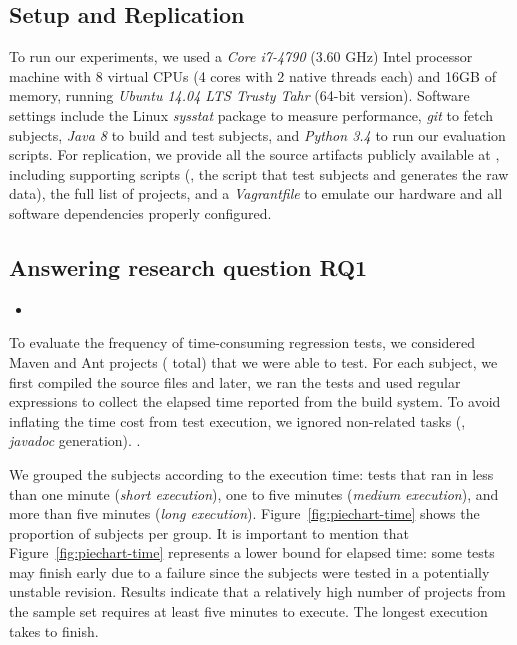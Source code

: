 \subsection{Setup and Replication}
\label{sec:setup}

To run our experiments, we used a \emph{Core i7-4790} (3.60 GHz) Intel
processor machine with 8 virtual CPUs (4 cores with 2 native threads
each) and 16GB of memory, running \emph{Ubuntu 14.04 LTS Trusty Tahr}
(64-bit version). Software settings include the Linux \emph{sysstat}
package to measure performance, \emph{git} to fetch subjects,
\emph{Java 8} to build and test subjects, and \emph{Python 3.4} to run
our evaluation scripts. For replication, we provide all the source
artifacts publicly available at , including
supporting scripts (\eg, the script that test subjects and generates
the raw data), the full list of projects, and a \emph{Vagrantfile} to
emulate our hardware and all software dependencies properly configured.

\subsection{Answering research question RQ1}
\label{sec:rqone}

\begin{itemize}
    \item \RQA
\end{itemize}

To evaluate the frequency of time-consuming regression tests, we
considered  Maven and  Ant projects ( total)
that we were able to test. For each subject, we first compiled the
source files and later, we ran the tests and used regular expressions
to collect the elapsed time reported from the build system. To avoid
inflating the time cost from test execution, we ignored non-related
tasks (\eg, \emph{javadoc} generation). .

We grouped the subjects according to the execution time: tests that
ran in less than one minute (\emph{short execution}), one to five
minutes (\emph{medium execution}), and more than five minutes
(\emph{long execution}). Figure~\ref{fig:piechart-time} shows the
proportion of subjects per group. It is important to mention that
Figure~\ref{fig:piechart-time} represents a lower bound for elapsed
time: some tests may finish early due to a failure since the subjects
were tested in a potentially unstable revision. Results indicate
that a relatively high number of projects from the sample set requires
at least five minutes to execute. The longest execution takes 
to finish.

